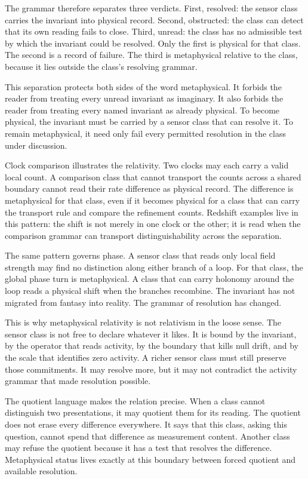 The grammar therefore separates three verdicts. First, resolved: the sensor
class carries the invariant into physical record. Second, obstructed: the
class can detect that its own reading fails to close. Third, unread: the
class has no admissible test by which the invariant could be resolved. Only
the first is physical for that class. The second is a record of failure. The
third is metaphysical relative to the class, because it lies outside the
class's resolving grammar.

This separation protects both sides of the word metaphysical. It forbids
the reader from treating every unread invariant as imaginary. It also
forbids the reader from treating every named invariant as already physical.
To become physical, the invariant must be carried by a sensor class that
can resolve it. To remain metaphysical, it need only fail every permitted
resolution in the class under discussion.

Clock comparison illustrates the relativity. Two clocks may each carry a
valid local count. A comparison class that cannot transport the counts
across a shared boundary cannot read their rate difference as physical
record. The difference is metaphysical for that class, even if it becomes
physical for a class that can carry the transport rule and compare the
refinement counts. Redshift examples live in this pattern: the shift is not
merely in one clock or the other; it is read when the comparison grammar can
transport distinguishability across the separation.

The same pattern governs phase. A sensor class that reads only local field
strength may find no distinction along either branch of a loop. For that
class, the global phase turn is metaphysical. A class that can carry
holonomy around the loop reads a physical shift when the branches recombine.
The invariant has not migrated from fantasy into reality. The grammar of
resolution has changed.

This is why metaphysical relativity is not relativism in the loose sense.
The sensor class is not free to declare whatever it likes. It is bound by
the invariant, by the operator that reads activity, by the boundary that
kills null drift, and by the scale that identifies zero activity. A richer
sensor class must still preserve those commitments. It may resolve more,
but it may not contradict the activity grammar that made resolution
possible.

The quotient language makes the relation precise. When a class cannot
distinguish two presentations, it may quotient them for its reading. The
quotient does not erase every difference everywhere. It says that this
class, asking this question, cannot spend that difference as measurement
content. Another class may refuse the quotient because it has a test that
resolves the difference. Metaphysical status lives exactly at this boundary
between forced quotient and available resolution.

